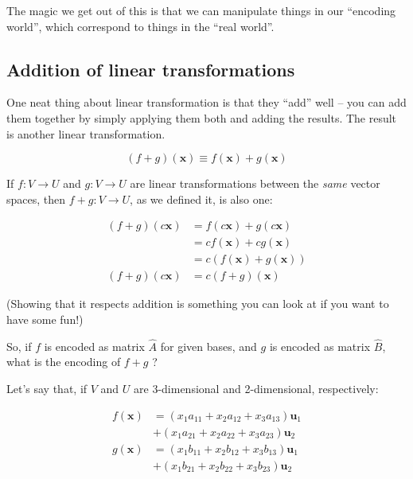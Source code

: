 \documentclass[]{article}
\begin{document}
The magic we get out of this is that we can manipulate things in our ``encoding
world'', which correspond to things in the ``real world''.

\hypertarget{addition-of-linear-transformations}{%
\subsection{Addition of linear
transformations}\label{addition-of-linear-transformations}}

One neat thing about linear transformation is that they ``add'' well -- you can
add them together by simply applying them both and adding the results. The
result is another linear transformation.

\[
(f + g)(\mathbf{x}) \equiv f(\mathbf{x}) + g(\mathbf{x})
\]

If \(f : V \rightarrow U\) and \(g : V \rightarrow U\) are linear
transformations between the \emph{same} vector spaces, then
\(f + g : V \rightarrow U\), as we defined it, is also one:

\[
\begin{aligned}
(f + g)(c \mathbf{x}) & = f(c \mathbf{x}) + g(c \mathbf{x}) \\
                      & = c f(\mathbf{x}) + c g(\mathbf{x}) \\
                      & = c ( f(\mathbf{x}) + g(\mathbf{x}) ) \\
(f + g)(c \mathbf{x}) & = c (f + g)(\mathbf{x})
\end{aligned}
\]

(Showing that it respects addition is something you can look at if you want to
have some fun!)

So, if \(f\) is encoded as matrix \(\hat{A}\) for given bases, and \(g\) is
encoded as matrix \(\hat{B}\), what is the encoding of \(f + g\) ?

Let's say that, if \(V\) and \(U\) are 3-dimensional and 2-dimensional,
respectively:

\[
\begin{aligned}
f(\mathbf{x}) & = (x_1 a_{11} + x_2 a_{12} + x_3 a_{13}) \mathbf{u}_1 \\
              & + (x_1 a_{21} + x_2 a_{22} + x_3 a_{23}) \mathbf{u}_2 \\
g(\mathbf{x}) & = (x_1 b_{11} + x_2 b_{12} + x_3 b_{13}) \mathbf{u}_1 \\
              & + (x_1 b_{21} + x_2 b_{22} + x_3 b_{23}) \mathbf{u}_2
\end{aligned}
\]
\end{document}
